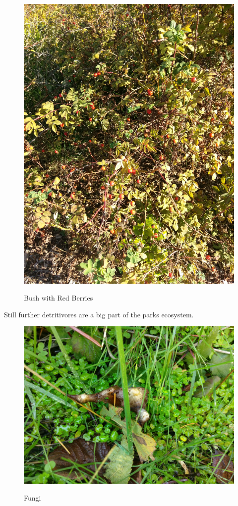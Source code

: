\documentclass{article}
\begin{document}
\begin{figure}[H]
\centering{}
\caption{Bush with Red Berries}
\includegraphics[scale=0.06]{red_berry_bush.jpg}
\label{berry}
\end{figure}
\newpage

Still further detritivores are a big part of the parks ecosystem.

\begin{figure}[H]
\centering{}
\caption{Fungi}
\includegraphics[scale=0.05]{mushrooms1.jpg}
\label{fungi}
\end{figure}
\end{document}
